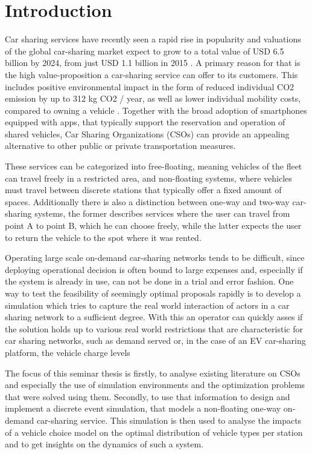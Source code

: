 \clearpage
\section{Introduction}
\label{sec:Intro}

Car sharing services have recently seen a rapid rise in popularity 
and valuations of the global car-sharing market expect to grow to
a total value of USD 6.5 billion by 2024, from just USD 1.1 billion in 2015 . 
A primary reason for that is the high value-proposition a car-sharing service
can offer to its customers. This includes positive environmental impact in the form of
reduced individual CO2 emission by up to 312 kg CO2 / year, as well as
lower individual mobility costs, compared to owning a vehicle . Together with the
broad adoption of smartphones equipped with apps, that typically
support the reservation and operation of shared vehicles, Car Sharing Organizations (CSOs)
can provide an appealing alternative to other public or private transportation measures.

These services can be categorized into free-floating, meaning vehicles of the fleet
can travel freely in a restricted area, and non-floating systems, where vehicles must travel
between discrete stations that typically offer a fixed amount of spaces. Additionally
there is also a distinction between one-way and two-way car-sharing systems, the former
describes services where the user can travel from point A to point B, which he can choose
freely, while the latter expects the user to return the vehicle to the spot where it was
rented.

Operating large scale on-demand car-sharing networks tends to be difficult, since
deploying operational decision is often bound to large expenses and, especially if the
system is already in use, can not be done in a trial and error fashion. One way to test the feasibility of
seemingly optimal proposals rapidly is to develop a simulation which tries to capture the real world
interaction of actors in a car sharing network to a sufficient degree. With this an operator can 
quickly asses if the solution holds up to various real world restrictions that are characteristic
for car sharing networks, such as demand served or, in the case of an EV car-sharing platform, the vehicle
charge levels 

The focus of this seminar thesis is firstly, to analyse existing literature on CSOs and especially
the use of simulation environments and the optimization problems that were solved using them.
Secondly, to use that information to design
and implement a discrete event simulation, that models a non-floating one-way on-demand
car-sharing service. This simulation is then used to analyse the impacts of a vehicle
choice model on the optimal distribution of vehicle types per station and to get
insights on the dynamics of such a system. 
